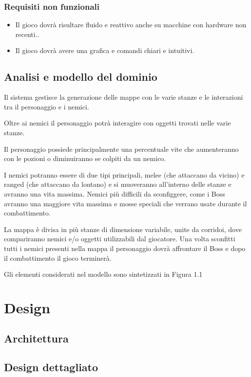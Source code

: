 \documentclass[a4paper,12pt]{report}
\begin{document}
    \subsection{Requisiti non funzionali}
    \begin{itemize}
        \item Il gioco dovrà risultare fluido e reattivo anche su macchine con hardware non recenti..
        \item Il gioco dovrà avere una grafica e comandi chiari e intuitivi.
    \end{itemize}
    \section{Analisi e modello del dominio}
    \par Il sistema gestisce la generazione delle mappe con le varie stanze e le interazioni tra il
    personaggio e i nemici.
    \par Oltre ai nemici il personaggio potrà interagire con oggetti trovati nelle varie stanze.
    \par Il personaggio possiede principalmente una percentuale vite che aumenteranno con le pozioni
    o diminuiranno se colpiti da un nemico.
    \par I nemici potranno essere di due tipi principali, melee (che attaccano da vicino) e ranged (che attaccano da lontano)
    e si muoveranno all'interno delle stanze e avranno una vita massima. Nemici più difficili da sconfiggere,
    come i Boss avranno una maggiore vita massima e mosse speciali che verrano usate durante il combattimento.
    \par La mappa è divisa in più stanze di dimensione variabile, unite da corridoi, dove compariranno nemici
    e/o oggetti utilizzabili dal giocatore.
    Una volta sconfitti tutti i nemici presenti nella mappa il personaggio dovrà affrontare il Boss e dopo il
    combattimento il gioco terminerà.
    \par \par Gli elementi considerati nel modello sono sintetizzati in Figura 1.1


    \chapter{Design}
    \section{Architettura}
    \section{Design dettagliato}
\end{document}
